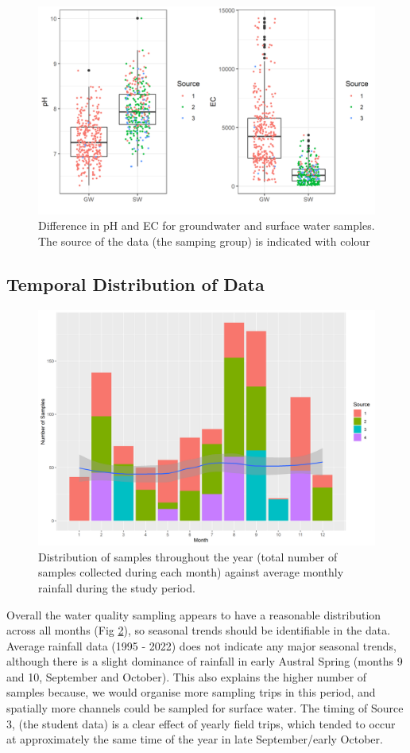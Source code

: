 \documentclass[, manuscript]{copernicus}
\begin{document}
\clearpage

\begin{figure}
\includegraphics[width=0.8\linewidth]{Figures/gwsw} \caption{Difference in pH and EC for groundwater and surface water samples. The source of the data (the samping group) is indicated with colour}\label{fig:gw_sw-plot}
\end{figure}

\subsection{Temporal Distribution of Data}

\clearpage

\begin{figure}
\includegraphics[width=0.5\linewidth]{Figures/monthly} \caption{Distribution of samples throughout the year (total number of samples collected during each month) against average monthly rainfall during the study period. }\label{fig:month-plot}
\end{figure}

Overall the water quality sampling appears to have a reasonable
distribution across all months (Fig \ref{fig:month-plot}), so seasonal
trends should be identifiable in the data. Average rainfall data (1995 -
2022) does not indicate any major seasonal trends, although there is a
slight dominance of rainfall in early Austral Spring (months 9 and 10,
September and October). This also explains the higher number of samples
because, we would organise more sampling trips in this period, and
spatially more channels could be sampled for surface water. The timing
of Source 3, (the student data) is a clear effect of yearly field trips,
which tended to occur at approximately the same time of the year in late
September/early October.
\end{document}
